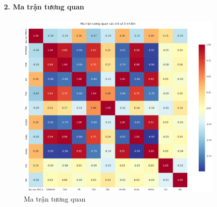 \documentclass[12pt,a4paper]{article}
\begin{document}
\paragraph{2. Ma trận tương quan}

\begin{figure}[H]
\centering
\includegraphics[width=0.9\textwidth]{results_comb_PM25_Hanoi_2018_sm_20251011_121424/20251011_121424_ma_tran_tuong_quan.png}
\caption{Ma trận tương quan}
\end{figure}
\end{document}
